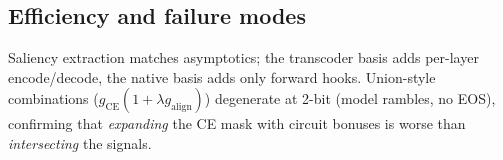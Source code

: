\subsection{Efficiency and failure modes}
Saliency extraction matches \baseline{} asymptotics; the transcoder basis adds
per-layer encode/decode, the native basis adds only forward hooks. Union-style
combinations ($g_{\text{CE}}(1+\lambda g_{\text{align}})$) degenerate at 2-bit
(model rambles, no EOS), confirming that \emph{expanding} the CE mask with
circuit bonuses is worse than \emph{intersecting} the signals.
